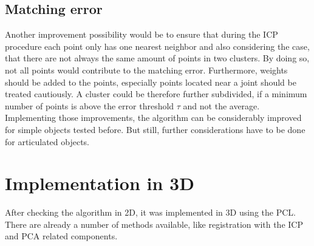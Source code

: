 \section{Matching error}
Another improvement possibility would be to ensure that during the ICP procedure each point only has one nearest neighbor and also considering the case, that there are not always the same amount of points in two clusters. By doing so, not all points would contribute to the matching error. Furthermore, weights should be added to the points, especially points located near a joint should be treated cautiously. A cluster could be therefore further subdivided, if a minimum number of points is above the error threshold $\tau$ and not the average. 
Implementing those improvements, the algorithm can be considerably improved for simple objects tested before. But still, further considerations have to be done for articulated objects.


\chapter{Implementation in 3D}

After checking the algorithm in 2D, it was implemented in 3D using the PCL. There are already a number of methods available, like registration with the ICP and PCA related components.